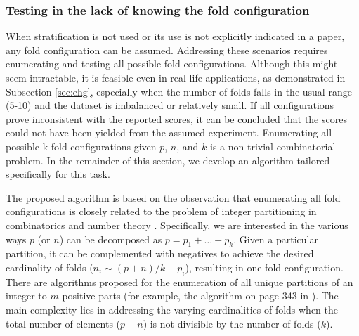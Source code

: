 \documentclass[3p, times]{elsarticle}
\begin{document}
\subsubsection{Testing in the lack of knowing the fold configuration}
\label{sec:kfold}

When stratification is not used or its use is not explicitly indicated in a paper, any fold configuration can be assumed. Addressing these scenarios requires enumerating and testing all possible fold configurations. Although this might seem intractable, it is feasible even in real-life applications, as demonstrated in Subsection \ref{sec:ehg}, especially when the number of folds falls in the usual range (5-10) and the dataset is imbalanced or relatively small. If all configurations prove inconsistent with the reported scores, it can be concluded that the scores could not have been yielded from the assumed experiment. Enumerating all possible k-fold configurations given $p$, $n$, and $k$ is a non-trivial combinatorial problem. In the remainder of this section, we develop an algorithm tailored specifically for this task.

The proposed algorithm is based on the observation that enumerating all fold configurations is closely related to the problem of integer partitioning in combinatorics and number theory \cite{intpart}. Specifically, we are interested in the various ways $p$ (or $n$) can be decomposed as $p = p_1 + \dots + p_k$. Given a particular partition, it can be complemented with negatives to achieve the desired cardinality of folds ($n_i \sim (p + n)/k - p_i$), resulting in one fold configuration. There are algorithms proposed for the enumeration of all unique partitions of an integer to $m$ positive parts (for example, the algorithm on page 343 in \cite{intpart}).
The main complexity lies in addressing the varying cardinalities of folds when the total number of elements ($p + n$) is not divisible by the number of folds ($k$).
\end{document}
